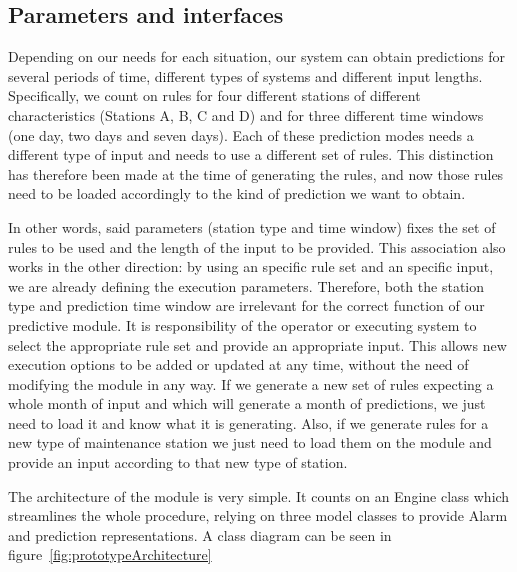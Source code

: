 \subsection{Parameters and interfaces}
\label{sec:parameters_and_interfaces}
Depending on our needs for each situation, our system can obtain predictions for several periods of time, different types of systems and different input lengths. Specifically, we count on rules for four different stations of different characteristics (Stations A, B, C and D) and for three different time windows (one day, two days and seven days). Each of these prediction modes needs a different type of input and needs to use a different set of rules. This distinction has therefore been made at the time of generating the rules, and now those rules need to be loaded accordingly to the kind of prediction we want to obtain.

In other words, said parameters (station type and time window) fixes the set of rules to be used and the length of the input to be provided. This association also works in the other direction: by using an specific rule set and an specific input, we are already defining the execution parameters. Therefore, both the station type and prediction time window are irrelevant for the correct function of our predictive module. It is responsibility of the operator or executing system to select the appropriate rule set and provide an appropriate input. This allows new execution options to be added or updated at any time, without the need of modifying the module in any way. If we generate a new set of rules expecting a whole month of input and which will generate a month of predictions, we just need to load it and know what it is generating. Also, if we generate rules for a new type of maintenance station we just need to load them on the module and provide an input according to that new type of station.

The architecture of the module is very simple. It counts on an Engine class which streamlines the whole procedure, relying on three model classes to provide Alarm and prediction representations. A class diagram can be seen in figure~\ref{fig:prototypeArchitecture}

